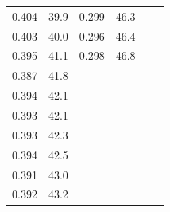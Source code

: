 \begin{table}[]
\begin{tabular}{|cccccc}
\multicolumn{1}{|c|}{0.404}   & \multicolumn{1}{c|}{39.9}     & \multicolumn{1}{c|}{0.299}     & \multicolumn{1}{c|}{46.3}     &                                &                               \\ \cline{1-4}
\multicolumn{1}{|c|}{0.403}   & \multicolumn{1}{c|}{40.0}     & \multicolumn{1}{c|}{0.296}     & \multicolumn{1}{c|}{46.4}     &                                &                               \\ \cline{1-4}
\multicolumn{1}{|c|}{0.395}   & \multicolumn{1}{c|}{41.1}     & \multicolumn{1}{c|}{0.298}     & \multicolumn{1}{c|}{46.8}     &                                &                               \\ \cline{1-4}
\multicolumn{1}{|c|}{0.387}   & \multicolumn{1}{c|}{41.8}     &                                &                               &                                &                               \\ \cline{1-2}
\multicolumn{1}{|c|}{0.394}   & \multicolumn{1}{c|}{42.1}     &                                &                               &                                &                               \\ \cline{1-2}
\multicolumn{1}{|c|}{0.393}   & \multicolumn{1}{c|}{42.1}     &                                &                               &                                &                               \\ \cline{1-2}
\multicolumn{1}{|c|}{0.393}   & \multicolumn{1}{c|}{42.3}     &                                &                               &                                &                               \\ \cline{1-2}
\multicolumn{1}{|c|}{0.394}   & \multicolumn{1}{c|}{42.5}     &                                &                               &                                &                               \\ \cline{1-2}
\multicolumn{1}{|c|}{0.391}   & \multicolumn{1}{c|}{43.0}     &                                &                               &                                &                               \\ \cline{1-2}
\multicolumn{1}{|c|}{0.392}   & \multicolumn{1}{c|}{43.2}     &                                &                               &                                &                               \\ \cline{1-2}
\end{tabular}
\end{table}
